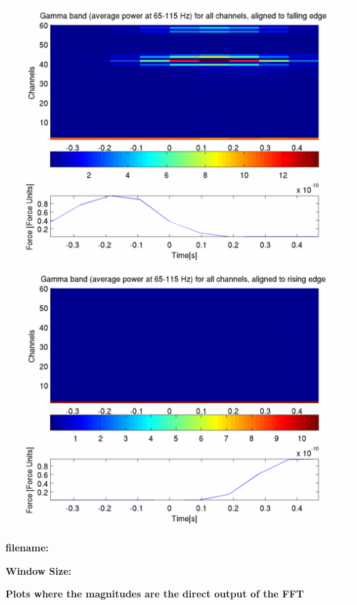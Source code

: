\documentclass[12pt]{article}
\begin{document}
\includegraphics[scale=0.2]{gamma_falling.png}
\includegraphics[scale=0.2]{gamma_rising.png}

\newpage

\begin{center}
\textbf{filename: \expandafter\detokenize\expandafter{\myvar}}

\textbf{Window Size: \expandafter\detokenize\expandafter{\window}}

\textbf{Plots where the magnitudes are the direct output of the FFT}
\end{center}
\end{document}
